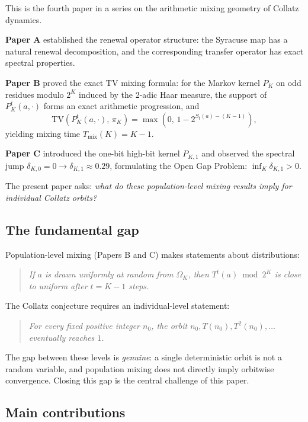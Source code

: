 \documentclass[12pt]{article}
\theoremstyle{definition}
\newcommand{\OK}{\Omega_K}
\newcommand{\TV}{\mathrm{TV}}
\begin{document}
This is the fourth paper in a series on the arithmetic mixing geometry of Collatz dynamics.

\textbf{Paper A} \cite{KamanoiA} established the renewal operator structure: the Syracuse map has a natural renewal decomposition, and the corresponding transfer operator has exact spectral properties.

\textbf{Paper B} \cite{KamanoiB} proved the exact TV mixing formula: for the Markov kernel $P_K$ on odd residues modulo $2^K$ induced by the 2-adic Haar measure, the support of $P_K^t(a,\cdot)$ forms an exact arithmetic progression, and
\[
  \TV(P_K^t(a,\cdot),\, \pi_K) = \max\!\left(0,\, 1 - 2^{S_t(a)-(K-1)}\right),
\]
yielding mixing time $T_{\mathrm{mix}}(K) = K-1$.

\textbf{Paper C} \cite{KamanoiC} introduced the one-bit high-bit kernel $P_{K,1}$ and observed the spectral jump $\delta_{K,0} = 0 \to \delta_{K,1} \approx 0.29$, formulating the Open Gap Problem: $\inf_K \delta_{K,1} > 0$.

The present paper asks: \emph{what do these population-level mixing results imply for individual Collatz orbits?}

\subsection{The fundamental gap}

Population-level mixing (Papers B and C) makes statements about distributions:
\begin{quote}
\emph{If $a$ is drawn uniformly at random from $\OK$, then $T^t(a) \bmod 2^K$ is close to uniform after $t = K-1$ steps.}
\end{quote}

The Collatz conjecture requires an individual-level statement:
\begin{quote}
\emph{For every fixed positive integer $n_0$, the orbit $n_0, T(n_0), T^2(n_0), \ldots$ eventually reaches $1$.}
\end{quote}

The gap between these levels is \emph{genuine}: a single deterministic orbit is not a random variable, and population mixing does not directly imply orbitwise convergence. Closing this gap is the central challenge of this paper.

\subsection{Main contributions}
\end{document}
